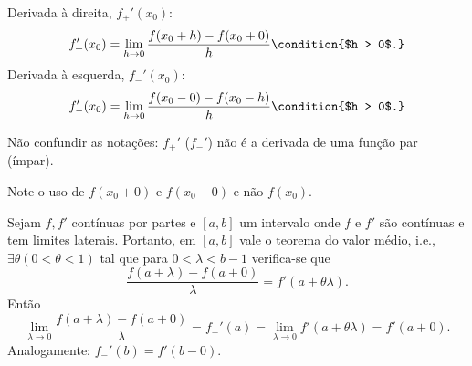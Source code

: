\begin{defi}
  Derivada \`{a} direita, $f_+'(x_0)$:
  \begin{dmath*}
    f_+'(x_0) = \lim_{h \to 0} \frac{f(x_0 + h) - f(x_0 + 0)}{h} \condition{$h >
    0$.}
  \end{dmath*}
  Derivada \`{a} esquerda, $f_-'(x_0)$:
  \begin{dmath*}
    f_-'(x_0) = \lim_{h \to 0} \frac{f(x_0 - 0) - f(x_0 - h)}{h} \condition{$h >
    0$.}
  \end{dmath*}
\end{defi}
\begin{obs}
  Não confundir as notações: $f_+'$ ($f_-'$) não é a derivada de uma função par
  (ímpar).
\end{obs}
\begin{obs}
  Note o uso de $f(x_0 + 0)$ e $f(x_0 - 0)$ e não $f(x_0)$.
\end{obs}

Sejam $f, f'$ contínuas por partes e $[a,b]$ um intervalo onde $f$ e $f'$ são
contínuas e tem limites laterais. Portanto, em $[a,b]$ vale o teorema do valor
médio, i.e., $\exists \theta (0 < \theta < 1)$ tal que para $0 < \lambda < b -
1$ verifica-se que
\begin{dmath*}
  \frac{f(a + \lambda) - f(a + 0)}{\lambda} = f'(a + \theta \lambda).
\end{dmath*}
Então
\begin{dmath*}
  \lim_{\lambda \to 0} \frac{f(a + \lambda) - f(a + 0)}{\lambda} = f_+'(a) =
  \lim_{\lambda \to 0} f'(a + \theta \lambda) = f'(a + 0).
\end{dmath*}
Analogamente: $f_-'(b) = f'(b - 0)$.

